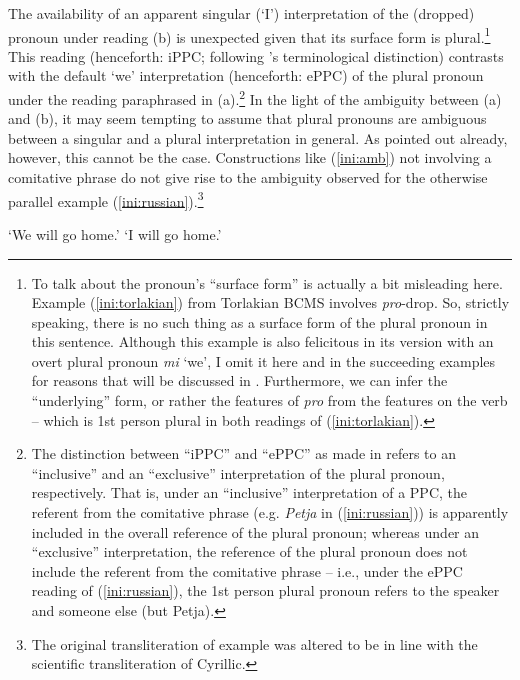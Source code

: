 \documentclass[output=paper,colorlinks,citecolor=brown]{langscibook}
\begin{document}
\noindent The availability of an apparent singular (`I') interpretation of the (dropped) pronoun under reading (b) is unexpected given that its surface form is plural.\footnote{To talk about the pronoun's ``surface form'' is actually a bit misleading here. Example (\ref{ini:torlakian}) from Torlakian BCMS involves \textit{pro}-drop. So, strictly speaking, there is no such thing as a surface form of the plural pronoun in this sentence. Although this example is also felicitous in its version with an overt plural pronoun \textit{mi} `we', I omit it here and in the succeeding examples for reasons that will be discussed in %
. Furthermore, we can infer the ``underlying'' form, or rather the features of \textit{pro} from the features on the verb -- which is 1st person plural in both readings of (\ref{ini:torlakian}).} This reading (henceforth: iPPC; following \citeauthor{Feldman2003}'s \citeyear{Feldman2003} %
terminological distinction) contrasts with the default `we' interpretation (henceforth: ePPC) of the plural pronoun under the reading paraphrased in (a).\footnote{The distinction between ``iPPC'' and ``ePPC'' as made in \citet{Feldman2003} refers to an ``inclusive'' and an ``exclusive'' interpretation of the plural pronoun, respectively. That is, under an ``inclusive'' interpretation of a PPC, the referent from the comitative phrase (e.g. \textit{Petja} in (\ref{ini:russian})) is apparently included in the overall reference of the plural pronoun; whereas under an ``exclusive'' interpretation, the reference of the plural pronoun does not include the referent from the comitative phrase -- i.e., under the ePPC reading of (\ref{ini:russian}), the 1st person plural pronoun refers to the speaker and someone else (but Petja).} In the light of the ambiguity between (a) and (b), it may seem tempting to assume that plural pronouns are ambiguous between a singular and a plural interpretation in general. As \citet{VassilievaLarson2001} pointed out already, however, this cannot be the case. Constructions like (\ref{ini:amb}) not involving a comitative phrase do not give rise to the ambiguity observed for the otherwise parallel example (\ref{ini:russian}).\footnote{The original transliteration of example  was altered to be in line with the scientific transliteration of Cyrillic.} 

 \label{ini:amb}
\ea `We will go home.'
\ex *`I will go home.'
\z \z
\end{document}
